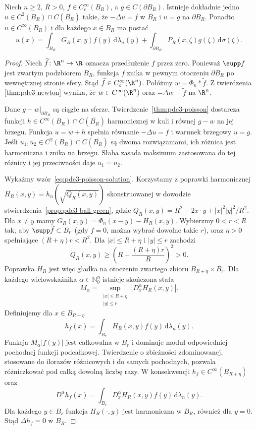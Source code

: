 \begin{twierdzenie}
\label{thm:pde3-ball-poisson}
Niech $n\geq2$, $R>0$, $f\in C_c^\infty(B_R)$,
a $g\in C(\partial B_R)$. Istnieje dokładnie jedno
$u\in C^2(B_R)\cap C(\overline{B_R})$ takie, że
$-\Delta u=f$ w $B_R$ i $u=g$ na $\partial B_R$.
Ponadto $u\in C^\infty(B_R)$ i dla każdego $x\in B_R$
ma postać
\begin{equation}\label{eq:pde3-poisson-solution}
 u(x)=\int_{B_R}G_R(x,y)f(y)\,\mathrm d\lambda_n(y)
 +\int_{\partial B_R}P_R(x,\zeta)g(\zeta)
 \,\mathrm d\sigma(\zeta).
\end{equation}
\end{twierdzenie}
\begin{proof}
Niech $\widetilde f\colon\R^n\to\R$ oznacza przedłużenie
$f$ przez zero. Ponieważ $\supp f$ jest zwartym
podzbiorem $B_R$, funkcja $f$ znika w pewnym otoczeniu
$\partial B_R$ po wewnętrznej stronie sfery.
Stąd $\widetilde f\in C_c^\infty(\R^n)$.
Połóżmy $w=\Phi_n*\widetilde f$. Z twierdzenia
\ref{thm:pde3-newton} wynika, że $w\in C^\infty(\R^n)$
oraz $-\Delta w=\widetilde f$ na $\R^n$.

Dane $g-w|_{\partial B_R}$ są ciągłe na sferze.
Twierdzenie~\ref{thm:pde3-poisson} dostarcza funkcji
$h\in C^\infty(B_R)\cap C(\overline{B_R})$ harmonicznej
w kuli i równej $g-w$ na jej brzegu. Funkcja $u=w+h$
spełnia równanie $-\Delta u=f$ i warunek brzegowy $u=g$.
Jeśli $u_1,u_2\in C^2(B_R)\cap C(\overline{B_R})$
są dwoma rozwiązaniami, ich różnica jest harmoniczna
i znika na brzegu. Słaba zasada maksimum zastosowana
do tej różnicy i jej przeciwności daje $u_1=u_2$.

Wykażmy wzór~\eqref{eq:pde3-poisson-solution}.
Korzystamy z poprawki harmonicznej
$H_R(x,y)=h_n(\sqrt{Q_R(x,y)})$ skonstruowanej
w dowodzie stwierdzenia~\ref{prop:pde3-ball-green},
gdzie $Q_R(x,y)=R^2-2x\cdot y+|x|^2|y|^2/R^2$.
Dla $x\ne y$ mamy $G_R(x,y)=\Phi_n(x-y)-H_R(x,y)$.
Wybierzmy $0<r<R$ tak, aby $\supp\widetilde f\subset B_r$
(gdy $f=0$, można wybrać dowolne takie $r$), oraz
$\eta>0$ spełniające $(R+\eta)r<R^2$. Dla
$|x|\leq R+\eta$ i $|y|\leq r$ zachodzi
\[
 Q_R(x,y)\geq
 \left(R-\frac{(R+\eta)r}{R}\right)^2>0.
\]
Poprawka $H_R$ jest więc gładka na otoczeniu zwartego
zbioru $\overline{B_{R+\eta}}\times\overline{B_r}$.
Dla każdego wielowskaźnika $\alpha\in\mathbb N_0^n$
istnieje skończona stała
\[
 M_\alpha=\sup_{\substack{|x|\leq R+\eta\\ |y|\leq r}}
 |D_x^\alpha H_R(x,y)|.
\]
Definiujemy dla $x\in B_{R+\eta}$
\[
 h_f(x)=\int_{B_r}H_R(x,y)f(y)\,\mathrm d\lambda_n(y).
\]
Funkcja $M_\alpha|f(y)|$ jest całkowalna w $B_r$
i dominuje moduł odpowiedniej pochodnej funkcji
podcałkowej. Twierdzenie o zbieżności zdominowanej,
stosowane do ilorazów różnicowych i do samych pochodnych,
pozwala różniczkować pod całką dowolną liczbę razy.
W konsekwencji $h_f\in C^\infty(B_{R+\eta})$ oraz
\[
 D^\alpha h_f(x)=\int_{B_r}D_x^\alpha H_R(x,y)
 f(y)\,\mathrm d\lambda_n(y).
\]
Dla każdego $y\in B_r$ funkcja $H_R(\cdot,y)$
jest harmoniczna w $B_R$, również dla $y=0$.
Stąd $\Delta h_f=0$ w $B_R$.


\end{proof}
